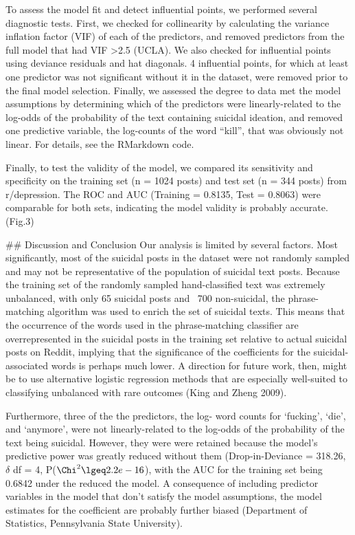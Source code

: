 To assess the model fit and detect influential points, we performed several diagnostic tests. First, we checked for collinearity by calculating the variance inflation factor (VIF) of each of the predictors, and removed predictors from the full model that had VIF >2.5 (UCLA). We also checked for influential points using deviance residuals and hat diagonals. 4 influential points, for which at least one predictor was not significant without it in the dataset, were removed prior to the final model selection. Finally, we assessed the degree to data met the model assumptions by determining which of the predictors were linearly-related to the log-odds of the probability of the text containing suicidal ideation, and removed one predictive variable, the log-counts of the word “kill”, that was obviously not linear. For details, see the RMarkdown code.


Finally, to test the validity of the model, we compared its sensitivity and specificity on the training set (n = 1024 posts) and test set (n = 344 posts) from r/depression. The ROC and AUC (Training = 0.8135, Test = 0.8063) were comparable for both sets, indicating the model validity is probably accurate. (Fig.3)


## Discussion and Conclusion
Our analysis is limited by several factors. Most significantly, most of the suicidal posts in the dataset were not randomly sampled and may not be representative of the population of suicidal text posts.  Because the training set of the randomly sampled hand-classified text was extremely unbalanced, with only 65 suicidal posts and ~700 non-suicidal, the phrase-matching algorithm was used to enrich the set of suicidal texts. This means that the occurrence of the words used in the phrase-matching classifier are overrepresented in the suicidal posts in the training set relative to actual suicidal posts on Reddit, implying that the significance of the coefficients for the suicidal-associated words is perhaps much lower. A direction for future work, then, might be to use alternative logistic regression methods that are especially well-suited to classifying unbalanced with rare outcomes (King and Zheng 2009).


Furthermore, three of the the predictors, the log- word counts for ‘fucking’, ‘die’, and ‘anymore’, were not linearly-related to the log-odds of the probability of the text being suicidal. However, they were were retained because the model’s predictive power was greatly reduced without them (Drop-in-Deviance = 318.26, $\delta$ df = 4,  P($\Chi^2 \lgeq 2.2e-16$), with the AUC for the training set being 0.6842 under the reduced the model. A consequence of including predictor variables in the model that don’t satisfy the model assumptions, the model estimates for the coefficient are probably further biased (Department of Statistics, Pennsylvania State University).



